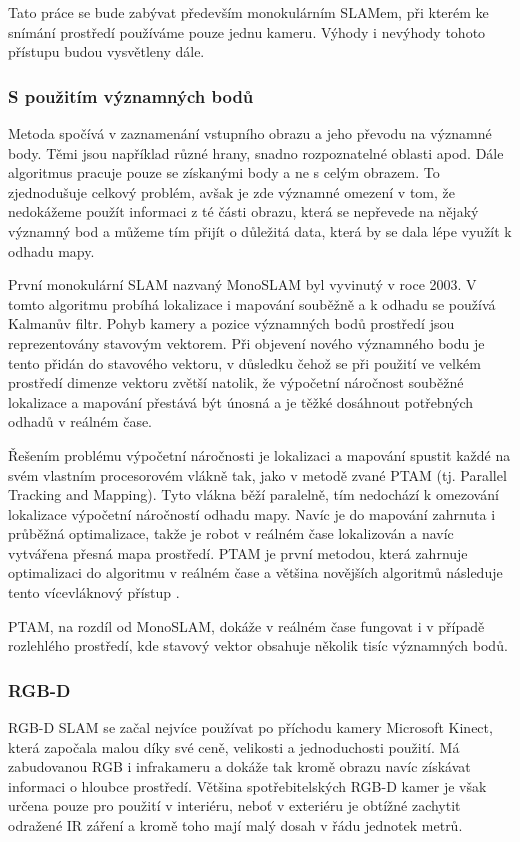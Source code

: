 \documentclass[12pt,a4paper]{article}
\begin{document}
Tato práce se bude zabývat především monokulárním SLAMem, při kterém ke snímání prostředí používáme pouze jednu kameru. Výhody i nevýhody tohoto přístupu budou vysvětleny dále.

\subsubsection{S použitím významných bodů}
Metoda spočívá v zaznamenání vstupního obrazu a jeho převodu na významné body. Těmi jsou například různé hrany, snadno rozpoznatelné oblasti apod. Dále algoritmus pracuje pouze se získanými body a ne s celým obrazem. To zjednodušuje celkový problém, avšak je zde významné omezení v tom, že nedokážeme použít informaci z té části obrazu, která se nepřevede na nějaký významný bod a můžeme tím přijít o důležitá data, která by se dala lépe využít k odhadu mapy.

První monokulární SLAM nazvaný MonoSLAM byl vyvinutý v roce 2003. V tomto algoritmu probíhá lokalizace i mapování souběžně a k odhadu se používá Kalmanův filtr. Pohyb kamery a pozice významných bodů prostředí jsou reprezentovány stavovým vektorem. Při objevení nového významného bodu je tento přidán do stavového vektoru, v důsledku čehož se při použití ve velkém prostředí dimenze vektoru zvětší natolik, že výpočetní náročnost souběžné lokalizace a mapování přestává být únosná a je těžké dosáhnout potřebných odhadů v reálném čase. 

Řešením problému výpočetní náročnosti je lokalizaci a mapování spustit každé na svém vlastním procesorovém vlákně tak, jako v metodě zvané PTAM (tj. Parallel Tracking and Mapping). Tyto vlákna běží paralelně, tím nedochází k omezování lokalizace výpočetní náročností odhadu mapy. Navíc je do mapování zahrnuta i průběžná optimalizace, takže je robot v reálném čase lokalizován a navíc vytvářena přesná mapa prostředí. PTAM je první metodou, která zahrnuje optimalizaci do algoritmu v reálném čase a většina novějších algoritmů následuje tento vícevláknový přístup \cite{Taketomi_visual}.

PTAM, na rozdíl od MonoSLAM, dokáže v reálném čase fungovat i v případě rozlehlého prostředí, kde stavový vektor obsahuje několik tisíc významných bodů.

\subsubsection{RGB-D}
RGB-D SLAM se začal nejvíce používat po příchodu kamery Microsoft Kinect, která započala malou  díky své ceně, velikosti a jednoduchosti použití. Má zabudovanou RGB i infrakameru a dokáže tak kromě obrazu navíc získávat informaci o hloubce prostředí. Většina spotřebitelských RGB-D kamer je však určena pouze pro použití v interiéru, neboť v exteriéru je obtížné zachytit odražené IR záření a kromě toho mají malý dosah v řádu jednotek metrů.
\end{document}
